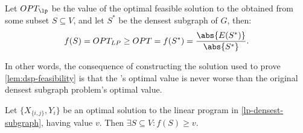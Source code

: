 \begin{corollary}
    Let $OPT_{\lp}$ be the value of the optimal feasible solution to the \lp{} obtained from some subset $S \subseteq V$, and let $S^*$ be the densest subgraph of $G$, then:
    \[
        f(S) = OPT_{LP} \geq OPT = f(S^*) = \frac{\abs{E(S^*)}}{\abs{S^*}}.
    \]
\end{corollary}

In other words, the consequence of constructing the solution used to prove \ref{lem:dsp-feasibility} is that the \lp{}'s optimal value is never worse than the original densest subgraph problem's optimal value.

\begin{lemma}\label{l:dsp-geq-lp}
    Let $\{X_{\{i, j\}}, Y_i\}$ be an optimal solution to the linear program in \ref{lp-densest-subgraph}, having value $v$. Then $\exists S \subseteq V : f(S) \geq v$.
\end{lemma}

